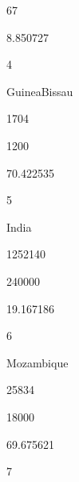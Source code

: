 \documentclass[letterpaper,10pt,english]{sphinxmanual}
\begin{document}
67





8.850727









4





Guinea\sphinxhyphen{}Bissau





1704





1200





70.422535









5





India





1252140





240000





19.167186









6





Mozambique





25834





18000





69.675621









7
\end{document}

